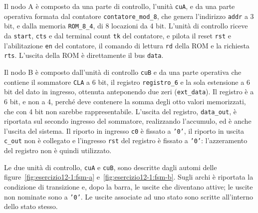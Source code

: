 Il nodo A è composto da una parte di controllo, l'unità \texttt{cuA}, e da una parte operativa formata dal contatore \texttt{contatore\_mod\_8}, che genera l'indirizzo \texttt{addr} a 3 bit, e dalla memoria \texttt{ROM\_8\_4}, di 8 locazioni da 4 bit. L'unità di controllo riceve da \texttt{start}, \texttt{cts} e dal terminal count \texttt{tk} del contatore, e pilota il reset \texttt{rst} e l'abilitazione \texttt{en} del contatore, il comando di lettura \texttt{rd} della ROM e la richiesta \texttt{rts}. L'uscita della ROM è direttamente il bus \texttt{data}.

Il nodo B è composto dall'unità di controllo \texttt{cuB} e da una parte operativa che contiene il sommatore \texttt{CLA} a 6 bit, il registro \texttt{registro\_6} e la sola estensione a 6 bit del dato in ingresso, ottenuta anteponendo due zeri (\texttt{ext\_data}). Il registro è a 6 bit, e non a 4, perché deve contenere la somma degli otto valori memorizzati, che con 4 bit non sarebbe rappresentabile. L'uscita del registro, \texttt{data\_out}, è riportata sul secondo ingresso del sommatore, realizzando l'accumulo, ed è anche l'uscita del sistema. Il riporto in ingresso \texttt{c0} è fissato a \texttt{'0'}, il riporto in uscita \texttt{c\_out} non è collegato e l'ingresso \texttt{rst} del registro è fissato a \texttt{'0'}: l'azzeramento del registro non è quindi utilizzato.


Le due unità di controllo, \texttt{cuA} e \texttt{cuB}, sono descritte dagli automi delle figure~\ref{fig:esercizio12-1:fsm-a} e~\ref{fig:esercizio12-1:fsm-b}. Sugli archi è riportata la condizione di transizione e, dopo la barra, le uscite che diventano attive; le uscite non nominate sono a \texttt{'0'}. Le uscite associate ad uno stato sono scritte all'interno dello stato stesso.

